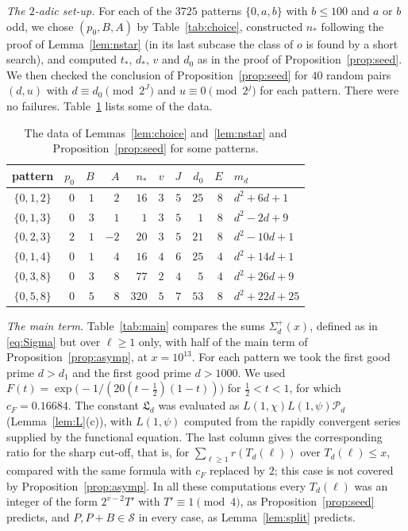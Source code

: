 \documentclass[11pt]{amsart}
\theoremstyle{remark}
\theoremstyle{definition}
\numberwithin{equation}{section}
\newcommand{\Sc}{\mathcal{S}}
\newcommand{\Lf}{\mathfrak{L}}
\begin{document}
\emph{The $2$-adic set-up.} For each of the $3725$ patterns $\{0,a,b\}$ with $b\le100$ and $a$ or $b$ odd, we chose $(p_0,B,A)$ by Table~\ref{tab:choice}, constructed $n_*$ following the proof of Lemma~\ref{lem:nstar} (in its last subcase the class of $o$ is found by a short search), and computed $t_*$, $d_*$, $v$ and $d_0$ as in the proof of Proposition~\ref{prop:seed}. We then checked the conclusion of Proposition~\ref{prop:seed} for $40$ random pairs $(d,u)$ with $d\equiv d_0\pmod{2^J}$ and $u\equiv0\pmod{2^j}$ for each pattern. There were no failures. Table~\ref{tab:seeds} lists some of the data.

\begin{table}[h]
\centering
\begin{tabular}{crrrrrrrrl}
\toprule
pattern & $p_0$ & $B$ & $A$ & $n_*$ & $v$ & $J$ & $d_0$ & $E$ & $m_d$\\
\midrule
$\{0,1,2\}$ & $0$ & $1$ & $2$ & $16$ & $3$ & $5$ & $25$ & $8$ & $d^2+6d+1$\\
$\{0,1,3\}$ & $0$ & $3$ & $1$ & $1$ & $3$ & $5$ & $1$ & $8$ & $d^2-2d+9$\\
$\{0,2,3\}$ & $2$ & $1$ & $-2$ & $20$ & $3$ & $5$ & $21$ & $8$ & $d^2-10d+1$\\
$\{0,1,4\}$ & $0$ & $1$ & $4$ & $16$ & $4$ & $6$ & $25$ & $4$ & $d^2+14d+1$\\
$\{0,3,8\}$ & $0$ & $3$ & $8$ & $77$ & $2$ & $4$ & $5$ & $4$ & $d^2+26d+9$\\
$\{0,5,8\}$ & $0$ & $5$ & $8$ & $320$ & $5$ & $7$ & $53$ & $8$ & $d^2+22d+25$\\
\bottomrule
\end{tabular}
\caption{The data of Lemmas~\ref{lem:choice} and~\ref{lem:nstar} and Proposition~\ref{prop:seed} for some patterns.}
\label{tab:seeds}
\end{table}

\emph{The main term.} Table~\ref{tab:main} compares the sums $\Sigma_d^+(x)$, defined as in \eqref{eq:Sigma} but over $\ell\ge1$ only, with half of the main term of Proposition~\ref{prop:asymp}, at $x=10^{13}$. For each pattern we took the first good prime $d>d_1$ and the first good prime $d>1000$. We used $F(t)=\exp\bigl(-1/(20(t-\frac12)(1-t))\bigr)$ for $\frac12<t<1$, for which $c_F=0.16684$. The constant $\Lf_d$ was evaluated as $L(1,\chi)L(1,\psi)\mathcal P_d$ (Lemma~\ref{lem:L}(c)), with $L(1,\psi)$ computed from the rapidly convergent series supplied by the functional equation. The last column gives the corresponding ratio for the sharp cut-off, that is, for $\sum_{\ell\ge1}r(T_d(\ell))$ over $T_d(\ell)\le x$, compared with the same formula with $c_F$ replaced by $2$; this case is not covered by Proposition~\ref{prop:asymp}. In all these computations every $T_d(\ell)$ was an integer of the form $2^{v-2}T'$ with $T'\equiv1\pmod 4$, as Proposition~\ref{prop:seed} predicts, and $P,P+B\in\Sc$ in every case, as Lemma~\ref{lem:split} predicts.
\end{document}
